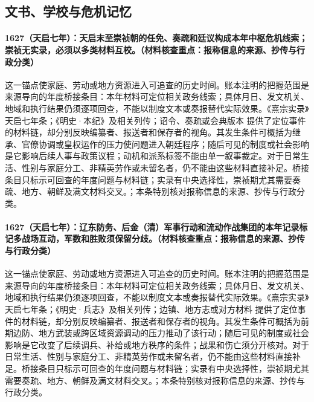 \subsection{文书、学校与危机记忆}

\paragraph{1627（天启七年）：天启末至崇祯朝的任免、奏疏和廷议构成本年中枢危机线索；崇祯无实录，必须以多类材料互校。（材料核查重点：报称信息的来源、抄传与行政分类）} 这一锚点使家庭、劳动或地方资源进入可追查的历史时间。账本注明的把握范围是来源导向的年度桥接条目：本年材料可定位相关政务线索；具体月日、发文机关、地域和执行结果仍须逐项回查，不能以制度文本或奏报替代实际效果。《熹宗实录》天启七年条；《明史·本纪》及相关列传；诏令、奏疏或会典版本 提供了定位事件的材料链，却分别反映编纂者、报送者和保存者的视角。其发生条件可概括为继承、官僚协调或皇权运作的压力使问题进入朝廷程序；随后可见的制度或社会影响是它影响后续人事与政策议程；动机和派系标签不能由单一叙事裁定。对于日常生活、性别与家庭分工、非精英劳作或未留名者，仍不能由这些材料直接补足。桥接条目只标示可回查的年度问题与材料链；实录有中央选择性，崇祯期尤其需要奏疏、地方、朝鲜及满文材料交叉。；本条特别核对报称信息的来源、抄传与行政分类。

\paragraph{1627（天启七年）：辽东防务、后金（清）军事行动和流动作战集团的本年记录标记多战场互动，军数和胜败须保留分歧。（材料核查重点：报称信息的来源、抄传与行政分类）} 这一锚点使家庭、劳动或地方资源进入可追查的历史时间。账本注明的把握范围是来源导向的年度桥接条目：本年材料可定位相关政务线索；具体月日、发文机关、地域和执行结果仍须逐项回查，不能以制度文本或奏报替代实际效果。《熹宗实录》天启七年条；《明史·兵志》及相关列传；边镇、地方志或对方材料 提供了定位事件的材料链，却分别反映编纂者、报送者和保存者的视角。其发生条件可概括为前期边防、地方武装或跨区域资源调动的压力推动了该行动；随后可见的制度或社会影响是它改变了后续调兵、补给或地方秩序的条件；战果和伤亡须分开核对。对于日常生活、性别与家庭分工、非精英劳作或未留名者，仍不能由这些材料直接补足。桥接条目只标示可回查的年度问题与材料链；实录有中央选择性，崇祯期尤其需要奏疏、地方、朝鲜及满文材料交叉。；本条特别核对报称信息的来源、抄传与行政分类。

